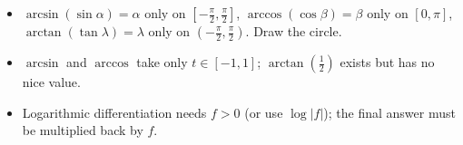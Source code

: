 \begin{warn}
\begin{itemize}
\item $\arcsin(\sin\alpha)=\alpha$ only on $[-\frac\pi2,\frac\pi2]$, $\arccos(\cos\beta)=\beta$ only on $[0,\pi]$, $\arctan(\tan\lambda)=\lambda$ only on $(-\frac\pi2,\frac\pi2)$. Draw the circle.
\item $\arcsin$ and $\arccos$ take only $t\in[-1,1]$; $\arctan(\frac12)$ exists but has no nice value.
\item Logarithmic differentiation needs $f>0$ (or use $\log|f|$); the final answer must be multiplied back by $f$.
\end{itemize}
\end{warn}
